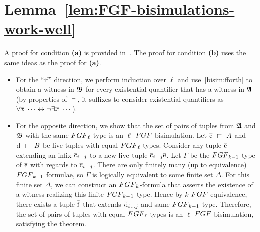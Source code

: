   \section{Lemma~\ref{lem:FGF-bisimulations-work-well}}
  \fgfbisimwork*
\fi
\ifmainpart
\begin{proofsketch}
  A proof for condition \textbf{(a)} is provided in~\cite[Lemma 3]{BednarczykJ22}.
  The proof for condition \textbf{(b)} uses the same ideas as the proof for \textbf{(a)}.
  \begin{itemize}
    \item
          For the ``if'' direction, we perform induction over $\ell$ and use~\ref{bisim:fforth} to obtain a witness in ${\mathfrak{B}}$ for every existential quantifier that has a witness in ${\mathfrak{A}}$ (by properties of $\models$, it suffixes to consider existential quantifiers as $\forall\overline{\mathit{x}}\ \cdots \leftrightarrow \lnot \exists \overline{\mathit{x}}\ \cdots$).
    \item
          For the opposite direction, we show that the set of pairs of tuples from ${\mathfrak{A}}$ and ${\mathfrak{B}}$ with the same $\FGF_{\ell}$-type is an $\ell$-$\FGF$-bisimulation.
          Let $\elemtuplec \sqin A$ and $\elemtupled \sqin B$ be live tuples with equal $\FGF_{\ell}$-types.
          Consider any tuple $\overline{\mathrm{e}}$ extending an infix $\overline{\mathrm{c}}_{i\ldots j}$ to a new live tuple $\overline{\mathrm{c}}_{i\ldots j}\overline{\mathrm{e}}$.
          Let $\Gamma$ be the $\FGF_{k-1}$-type of $\overline{\mathrm{e}}$ with regards to $\overline{\mathrm{c}}_{i\ldots j}$.
          There are only finitely many (up to equivalence) $\FGF_{k{-}1}$ formulae, so $\Gamma$ is logically equivalent to some finite set $\Delta$.
          For this finite set $\Delta$, we can construct an $\FGF_{k}$-formula that asserts the existence of a witness realizing this finite $\FGF_{k-1}$-type.
          Hence by $k$-$\FGF$-equivalence, there exists a tuple $\overline{\mathrm{f}}$ that extends $\overline{\mathrm{d}}_{i\ldots j}$ and same $\FGF_{k-1}$-type.
          Therefore, the set of pairs of tuples with equal $\FGF_{\ell}$-types is an $\ell$-$\FGF$-bisimulation, satisfying the theorem.
  \end{itemize}
\end{proofsketch}
\else
